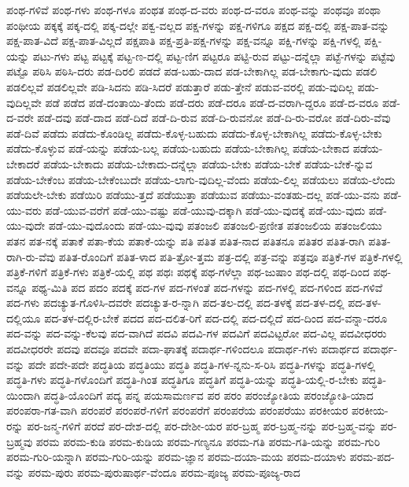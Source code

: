 {ಪಂಥ-ಗಳಿವೆ
ಪಂಥ-ಗಳು
ಪಂಥ-ಗಳೂ
ಪಂಥತ
ಪಂಥ-ದ-ವರು
ಪಂಥ-ದ-ವರೂ
ಪಂಥ-ವನ್ನು
ಪಂಥವೂ
ಪಂಥಾ
ಪಂಥೀಯ
ಪಕ್ಕಕ್ಕೆ
ಪಕ್ಕ-ದಲ್ಲಿ
ಪಕ್ಕ-ದಲ್ಲೇ
ಪಕ್ವ-ವಲ್ಲದ
ಪಕ್ಷ-ಗಳನ್ನು
ಪಕ್ಷ-ಗಳಿಗೂ
ಪಕ್ಷದ
ಪಕ್ಷ-ದಲ್ಲಿ
ಪಕ್ಷ-ಪಾತ-ವನ್ನು
ಪಕ್ಷ-ಪಾತ-ವಿದೆ
ಪಕ್ಷ-ಪಾತ-ವಿಲ್ಲದೆ
ಪಕ್ಷಪಾತಿ
ಪಕ್ಷ-ಪ್ರತಿ-ಪಕ್ಷ-ಗಳನ್ನು
ಪಕ್ಷ-ವನ್ನೂ
ಪಕ್ಷಿ-ಗಳನ್ನು
ಪಕ್ಷಿ-ಗಳಲ್ಲಿ
ಪಕ್ಷಿ-ಯನ್ನು
ಪಟು-ಗಳು
ಪಟ್ಟ
ಪಟ್ಟಕ್ಕೆ
ಪಟ್ಟ-ಣ-ದಲ್ಲಿ
ಪಟ್ಟ-ಣಿಗ
ಪಟ್ಟರೂ
ಪಟ್ಟಿ-ರುವ
ಪಟ್ಟು-ದನ್ನೆಲ್ಲಾ
ಪಟ್ಟೆ-ಗಳನ್ನು
ಪಟ್ಟೆವು
ಪಟ್ಟೊ
ಪಠಿಸಿ
ಪಠಿಸಿ-ದರು
ಪಡ-ದಿರಲಿ
ಪಡದೆ
ಪಡ-ಬಹು-ದಾದ
ಪಡ-ಬೇಕಾಗಿಲ್ಲ
ಪಡ-ಬೇಕಾಗು-ವುದು
ಪಡಲಿ
ಪಡಲಿಲ್ಲವೆ
ಪಡಲಿಲ್ಲವೇ
ಪಡಿ-ಸಿದನು
ಪಡಿ-ಸಿದರೆ
ಪಡುತ್ತಾರೆ
ಪಡು-ತ್ತೇನೆ
ಪಡುವ-ವರಲ್ಲಿ
ಪಡು-ವುದಿಲ್ಲ
ಪಡು-ವುದಿಲ್ಲವೇ
ಪಡೆ
ಪಡೆದ
ಪಡೆ-ದಂತಾಯಿ-ತೆಂದು
ಪಡೆ-ದರು
ಪಡೆ-ದರೂ
ಪಡೆ-ದ-ವರಾಗಿ-ದ್ದರೂ
ಪಡೆ-ದ-ವರೂ
ಪಡೆ-ದ-ವರೇ
ಪಡೆ-ದವು
ಪಡೆ-ದಾದ
ಪಡೆ-ದಿದೆ
ಪಡೆ-ದಿ-ರುವ
ಪಡೆ-ದಿ-ರುವನೋ
ಪಡೆ-ದಿ-ರು-ವರೋ
ಪಡೆ-ದಿರು-ವೆವು
ಪಡೆ-ದಿವೆ
ಪಡೆದು
ಪಡೆದು-ಕೊಂಡಿಲ್ಲ
ಪಡೆದು-ಕೊಳ್ಳ-ಬಹುದು
ಪಡೆದು-ಕೊಳ್ಳ-ಬೇಕಾಗಿಲ್ಲ
ಪಡೆದು-ಕೊಳ್ಳ-ಬೇಕು
ಪಡೆದು-ಕೊಳ್ಳುವ
ಪಡೆ-ಯನ್ನು
ಪಡೆಯ-ಬಲ್ಲ
ಪಡೆಯ-ಬಹುದು
ಪಡೆಯ-ಬೇಕಾಗಿಲ್ಲ
ಪಡೆಯ-ಬೇಕಾದ
ಪಡೆಯ-ಬೇಕಾದರೆ
ಪಡೆಯ-ಬೇಕಾದು
ಪಡೆಯ-ಬೇಕಾದು-ದನ್ನೆಲ್ಲಾ
ಪಡೆಯ-ಬೇಕು
ಪಡೆಯ-ಬೇಕೆ
ಪಡೆಯ-ಬೇಕೆ-ನ್ನುವ
ಪಡೆಯ-ಬೇಕೆಂಬ
ಪಡೆಯ-ಬೇಕೆಂಬುದೇ
ಪಡೆಯ-ಲಾಗು-ವುದಿಲ್ಲ-ವೆಂದು
ಪಡೆಯ-ಲಿಲ್ಲ
ಪಡೆಯಲು
ಪಡೆಯ-ಲೆಂದು
ಪಡೆಯಲೇ-ಬೇಕು
ಪಡೆಯಿರಿ
ಪಡೆಯು-ತ್ತದೆ
ಪಡೆಯುತ್ತಾ
ಪಡೆಯುವ
ಪಡೆಯು-ವಂತಹು-ದಲ್ಲ
ಪಡೆ-ಯು-ವನು
ಪಡೆ-ಯು-ವರು
ಪಡೆ-ಯುವ-ವರೆಗೆ
ಪಡೆ-ಯು-ವಷ್ಟು
ಪಡೆ-ಯುವು-ದಕ್ಕಾಗಿ
ಪಡೆ-ಯು-ವುದಕ್ಕೆ
ಪಡೆ-ಯು-ವುದು
ಪಡೆ-ಯು-ವುದೇ
ಪಡೆ-ಯು-ವುದೊಂದು
ಪಡೆ-ಯು-ವುವು
ಪತಂಜಲಿ
ಪತಂಜಲಿ-ಪ್ರಣೀತ
ಪತಂಜಲಿಯ
ಪತಂಜಲಿಯು
ಪತನ
ಪತ-ನಕ್ಕೆ
ಪತಾಕೆ
ಪತಾ-ಕೆಯ
ಪತಾಕೆ-ಯನ್ನು
ಪತಿ
ಪತಿತ
ಪತಿತ-ನಾದ
ಪತಿತನೂ
ಪತಿತರ
ಪತಿತ-ರಾಗಿ
ಪತಿತ-ರಾಗಿ-ರು-ವೆವು
ಪತಿತ-ರೊಂದಿಗೆ
ಪತಿತ-ಳಾದ
ಪತಿ-ತ್ರೋ-ತ್ತಮ
ಪತ್ರ-ದಲ್ಲಿ
ಪತ್ರ-ವನ್ನು
ಪತ್ರವೂ
ಪತ್ರಿಕೆ-ಗಳ
ಪತ್ರಿಕೆ-ಗಳಲ್ಲಿ
ಪತ್ರಿಕೆ-ಗಳಿಗೆ
ಪತ್ರಿಕೆ-ಗಳು
ಪತ್ರಿಕೆ-ಯಲ್ಲಿ
ಪಥ
ಪಥಃ
ಪಥಕ್ಕೆ
ಪಥ-ಗಳೆಲ್ಲಾ
ಪಥ-ಜುಷಾಂ
ಪಥ-ದಲ್ಲಿ
ಪಥ-ದಿಂದ
ಪಥ-ವನ್ನೂ
ಪಥ್ಯ-ಮಿತಿ
ಪದ
ಪದಂ
ಪದಕ್ಕೆ
ಪದ-ಗಳ
ಪದ-ಗಳಂತೆ
ಪದ-ಗಳನ್ನು
ಪದ-ಗಳಲ್ಲಿ
ಪದ-ಗಳಿಂದ
ಪದ-ಗಳಿವೆ
ಪದ-ಗಳು
ಪದಚ್ಯುತ-ಗೊಳಿಸಿ-ದವರೇ
ಪದಚ್ಯುತ-ರ-ನ್ನಾಗಿ
ಪದ-ತಲ-ದಲ್ಲಿ
ಪದ-ತಳಕ್ಕೆ
ಪದ-ತಳ-ದಲ್ಲಿ
ಪದ-ತಳ-ದಲ್ಲಿಯೂ
ಪದ-ತಳ-ದಲ್ಲಿರ-ಬೇಕೆ
ಪದದ
ಪದ-ದಲಿತ-ರಿಗೆ
ಪದ-ದಲ್ಲಿ
ಪದ-ದಲ್ಲಿದೆ
ಪದ-ದಿಂದ
ಪದ-ವನ್ನಾ-ದರೂ
ಪದ-ವನ್ನು
ಪದ-ವನ್ನು-ಕೆಲವು
ಪದ-ವಾಗಿದೆ
ಪದವಿ
ಪದವಿ-ಗಳ
ಪದವಿಗೆ
ಪದವಿಟ್ಟರೋ
ಪದ-ವಿಲ್ಲ
ಪದವೀಧರರು
ಪದವೀಧರರೇ
ಪದವು
ಪದವೂ
ಪದವೇ
ಪದಾ-ಘಾತಕ್ಕೆ
ಪದಾರ್ಥ-ಗಳಿಂದಲೂ
ಪದಾರ್ಥ-ಗಳು
ಪದಾರ್ಥದ
ಪದಾರ್ಥ-ವನ್ನು
ಪದೇ
ಪದೇ-ಪದೇ
ಪದ್ಧತಿಯ
ಪದ್ಧತಿಯು
ಪದ್ಧತಿ
ಪದ್ಧತಿ-ಗಳ-ನ್ನನು-ಸ-ರಿಸಿ
ಪದ್ಧತಿ-ಗಳನ್ನು
ಪದ್ಧತಿ-ಗಳಲ್ಲಿ
ಪದ್ಧತಿ-ಗಳು
ಪದ್ಧತಿ-ಗಳೊಂದಿಗೆ
ಪದ್ಧತಿ-ಗಿಂತ
ಪದ್ಧತಿಗೂ
ಪದ್ಧತಿಗೆ
ಪದ್ಧತಿ-ಯನ್ನು
ಪದ್ಧತಿ-ಯಲ್ಲಿ-ರ-ಬೇಕು
ಪದ್ಧತಿ-ಯಿಂದಾಗಿ
ಪದ್ಧತಿ-ಯೊಂದಿಗೆ
ಪದ್ಯ
ಪನ್ನ
ಪಯಸಾಮರ್ಣವ
ಪರ
ಪರಂ
ಪರಂಜ್ಯೋತಿಯ
ಪರಂಜ್ಯೋತಿ-ಯಾದ
ಪರಂಪರಾ-ಗತ-ವಾಗಿ
ಪರಂಪರೆ
ಪರಂಪರೆ-ಗಳಿಗೆ
ಪರಂಪರೆಗೆ
ಪರಂಪರೆಯ
ಪರಂಪರೆಯು
ಪರಕೀಯರ
ಪರಕೀಯ-ರನ್ನು
ಪರ-ಜನ್ಮ-ಗಳಿಗೆ
ಪರದೆ
ಪರ-ದೇಶ-ದಲ್ಲಿ
ಪರ-ದೇಶೀ-ಯರ
ಪರ-ಬ್ರಹ್ಮ
ಪರ-ಬ್ರಹ್ಮ-ನನ್ನು
ಪರ-ಬ್ರಹ್ಮ-ವನ್ನು
ಪರ-ಬ್ರಹ್ಮವು
ಪರಮ
ಪರಮ-ಕುಡಿ
ಪರಮ-ಕುಡಿಯ
ಪರಮ-ಗಣ್ಯನೂ
ಪರಮ-ಗತಿ
ಪರಮ-ಗತಿ-ಯನ್ನು
ಪರಮ-ಗುರಿ
ಪರಮ-ಗುರಿ-ಯನ್ನಾಗಿ
ಪರಮ-ಗುರಿ-ಯನ್ನು
ಪರಮ-ಜ್ಞಾನ
ಪರಮ-ದಯಾ-ಮಯ
ಪರಮ-ದಯಾಳು
ಪರಮ-ಪದ-ವನ್ನು
ಪರಮ-ಪುರು
ಪರಮ-ಪುರುಷಾರ್ಥ-ವೆಂದೂ
ಪರಮ-ಪೂಜ್ಯ
ಪರಮ-ಪೂಜ್ಯ-ರಾದ
}
